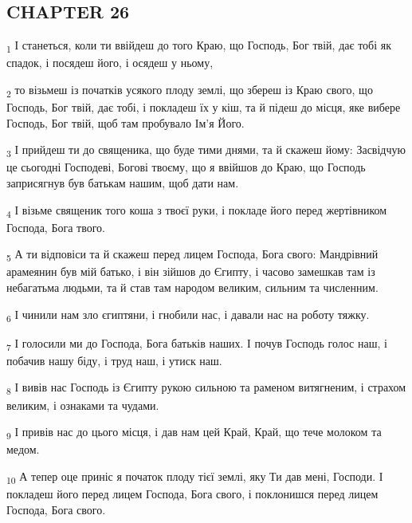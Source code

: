 \subsection{CHAPTER 26}
\begin{tcolorbox}
\textsubscript{1} І станеться, коли ти ввійдеш до того Краю, що Господь, Бог твій, дає тобі як спадок, і посядеш його, і осядеш у ньому,
\end{tcolorbox}
\begin{tcolorbox}
\textsubscript{2} то візьмеш із початків усякого плоду землі, що збереш із Краю свого, що Господь, Бог твій, дає тобі, і покладеш їх у кіш, та й підеш до місця, яке вибере Господь, Бог твій, щоб там пробувало Ім'я Його.
\end{tcolorbox}
\begin{tcolorbox}
\textsubscript{3} І прийдеш ти до священика, що буде тими днями, та й скажеш йому: Засвідчую це сьогодні Господеві, Богові твоєму, що я ввійшов до Краю, що Господь заприсягнув був батькам нашим, щоб дати нам.
\end{tcolorbox}
\begin{tcolorbox}
\textsubscript{4} І візьме священик того коша з твоєї руки, і покладе його перед жертівником Господа, Бога твого.
\end{tcolorbox}
\begin{tcolorbox}
\textsubscript{5} А ти відповіси та й скажеш перед лицем Господа, Бога свого: Мандрівний арамеянин був мій батько, і він зійшов до Єгипту, і часово замешкав там із небагатьма людьми, та й став там народом великим, сильним та численним.
\end{tcolorbox}
\begin{tcolorbox}
\textsubscript{6} І чинили нам зло єгиптяни, і гнобили нас, і давали нас на роботу тяжку.
\end{tcolorbox}
\begin{tcolorbox}
\textsubscript{7} І голосили ми до Господа, Бога батьків наших. І почув Господь голос наш, і побачив нашу біду, і труд наш, і утиск наш.
\end{tcolorbox}
\begin{tcolorbox}
\textsubscript{8} І вивів нас Господь із Єгипту рукою сильною та раменом витягненим, і страхом великим, і ознаками та чудами.
\end{tcolorbox}
\begin{tcolorbox}
\textsubscript{9} І привів нас до цього місця, і дав нам цей Край, Край, що тече молоком та медом.
\end{tcolorbox}
\begin{tcolorbox}
\textsubscript{10} А тепер оце приніс я початок плоду тієї землі, яку Ти дав мені, Господи. І покладеш його перед лицем Господа, Бога свого, і поклонишся перед лицем Господа, Бога свого.
\end{tcolorbox}
